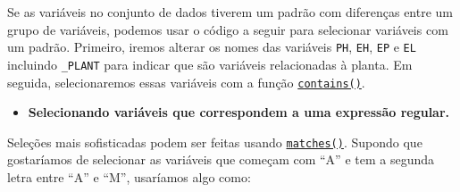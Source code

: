 \documentclass[
]{book}
\newenvironment{Shaded}{\begin{snugshade}}{\end{snugshade}}
\newcommand{\CommentTok}[1]{\textcolor[rgb]{0.56,0.35,0.01}{\textit{#1}}}
\newcommand{\DataTypeTok}[1]{\textcolor[rgb]{0.13,0.29,0.53}{#1}}
\newcommand{\KeywordTok}[1]{\textcolor[rgb]{0.13,0.29,0.53}{\textbf{#1}}}
\newcommand{\NormalTok}[1]{#1}
\newcommand{\OperatorTok}[1]{\textcolor[rgb]{0.81,0.36,0.00}{\textbf{#1}}}
\newcommand{\StringTok}[1]{\textcolor[rgb]{0.31,0.60,0.02}{#1}}
\providecommand{\tightlist}{%
  \setlength{\itemsep}{0pt}\setlength{\parskip}{0pt}}
\begin{document}
Se as variáveis no conjunto de dados tiverem um padrão com diferenças entre um grupo de variáveis, podemos usar o código a seguir para selecionar variáveis com um padrão. Primeiro, iremos alterar os nomes das variáveis \texttt{PH}, \texttt{EH}, \texttt{EP} e \texttt{EL} incluindo \texttt{\_PLANT} para indicar que são variáveis relacionadas à planta. Em seguida, selecionaremos essas variáveis com a função \href{https://tidyselect.r-lib.org/reference/select_helpers.html}{\texttt{contains()}}.

\begin{Shaded}
\end{Shaded}

\begin{itemize}
\tightlist
\item
  \textbf{Selecionando variáveis que correspondem a uma expressão regular.}
\end{itemize}

Seleções mais sofisticadas podem ser feitas usando \href{https://tidyselect.r-lib.org/reference/select_helpers.html}{\texttt{matches()}}. Supondo que gostaríamos de selecionar as variáveis que começam com ``A'' e tem a segunda letra entre ``A'' e ``M'', usaríamos algo como:
\end{document}
